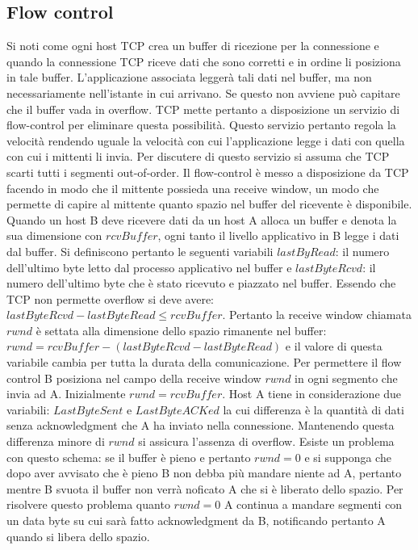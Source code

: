 \subsection{Flow control}
Si noti come ogni host TCP crea un buffer di ricezione per la connessione e quando la connessione TCP riceve dati che sono corretti e in ordine li posiziona
in tale buffer. L'applicazione associata legger\`a tali dati nel buffer, ma non necessariamente nell'istante in cui arrivano. Se questo non avviene pu\`o 
capitare che il buffer vada in overflow. TCP mette pertanto a disposizione un servizio di flow-control per eliminare questa possibilit\`a. Questo servizio
pertanto regola la velocit\`a rendendo uguale la velocit\`a con cui l'applicazione legge i dati con quella con cui i mittenti li invia. Per discutere di 
questo servizio si assuma che TCP scarti tutti i segmenti out-of-order. Il flow-control \`e messo a disposizione da TCP facendo in modo che il mittente
possieda una receive window, un modo che permette di capire al mittente quanto spazio nel buffer del ricevente \`e disponibile. Quando un host B deve
ricevere dati da un host A alloca un buffer e denota la sua dimensione con $rcvBuffer$, ogni tanto il livello applicativo in B legge i dati dal buffer. Si
definiscono pertanto le seguenti variabili $lastByRead$: il numero dell'ultimo byte letto dal processo applicativo nel buffer e $lastByteRcvd$: il numero 
dell'ultimo byte che \`e stato ricevuto e piazzato nel buffer. Essendo che TCP non permette overflow si deve avere: $lastByteRcvd-lastByteRead\le 
rcvBuffer$. Pertanto la receive window chiamata $rwnd$ \`e settata alla dimensione dello spazio rimanente nel buffer: $rwnd=rcvBuffer-(lastByteRcvd-
lastByteRead)$ e il valore di questa variabile cambia per tutta la durata della comunicazione. Per permettere il flow control B posiziona nel campo della
receive window $rwnd$ in ogni segmento che invia ad A. Inizialmente $rwnd=rcvBuffer$. Host A tiene in considerazione due variabili: $LastByteSent$ e 
$LastByteACKed$ la cui differenza \`e la quantit\`a di dati senza acknowledgment che A ha inviato nella connessione. Mantenendo questa differenza minore di
$rwnd$ si assicura l'assenza di overflow. Esiste un problema con questo schema: se il buffer \`e pieno e pertanto $rwnd=0$ e si supponga che dopo aver
avvisato che \`e pieno B non debba pi\`u mandare niente ad A, pertanto mentre B svuota il buffer non verr\`a noficato A che si \`e liberato dello spazio.
Per risolvere questo problema quanto $rwnd=0$ A continua a mandare segmenti con un data byte su cui sar\`a fatto acknowledgment da B, notificando pertanto A
quando si libera dello spazio. 
